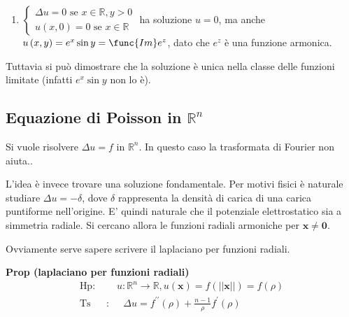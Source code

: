 \documentclass{article}
\begin{document}
\begin{enumerate}
\item $\left\{ 
\begin{array}{c}
\Delta u=0\text{ se }x\in 
\mathbb{R}
,y>0 \\ 
u\left( x,0\right) =0\text{ se }x\in 
\mathbb{R}%
\end{array}%
\right. $ ha soluzione $u=0$, ma anche $u\left( x,y\right) =e^{x}\sin y=%
\func{Im}e^{z}$, dato che $e^{z}$ \`{e} una funzione armonica.
\end{enumerate}

Tuttavia si pu\`{o} dimostrare che la soluzione \`{e} unica nella classe
delle funzioni limitate (infatti $e^{x}\sin y$ non lo \`{e}).

\subsection{Equazione di Poisson in $%
\mathbb{R}
^{n}$}

Si vuole risolvere $\Delta u=f$ in $%
\mathbb{R}
^{n}$. In questo caso la trasformata di Fourier non aiuta..

L'idea \`{e} invece trovare una soluzione fondamentale. Per motivi fisici 
\`{e} naturale studiare $\Delta u=-\delta $, dove $\delta $ rappresenta la
densit\`{a} di carica di una carica puntiforme nell'origine. E' quindi
naturale che il potenziale elettrostatico sia a simmetria radiale. Si
cercano allora le funzioni radiali armoniche per $\mathbf{x\neq 0}$.

Ovviamente serve sapere scrivere il laplaciano per funzioni radiali.

\textbf{Prop (laplaciano per funzioni radiali)}%
\begin{eqnarray*}
\text{Hp}\text{: } &&u:%
\mathbb{R}
^{n}\rightarrow 
\mathbb{R}
,u\left( \mathbf{x}\right) =f\left( \left\vert \left\vert \mathbf{x}%
\right\vert \right\vert \right) =f\left( \rho \right) \\
\text{Ts} &\text{:}&\text{ }\Delta u=f^{\prime \prime }\left( \rho \right) +%
\frac{n-1}{\rho }f^{\prime }\left( \rho \right)
\end{eqnarray*}
\end{document}
